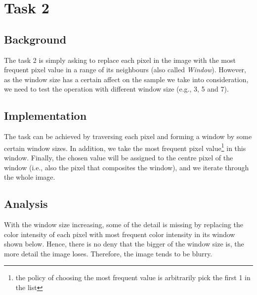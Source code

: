 \documentclass{article}
\begin{document}
\section{Task 2}
\subsection{Background}
The task 2 is simply asking to replace each pixel in the image with the most
frequent pixel value in a range of its neighbours (also called \textit{Window}). However, as the window size has a certain affect on the sample we take into consideration, we need to test the operation with different window size (e.g., 3, 5 and 7). 

\subsection{Implementation}
The task can be achieved by traversing
each pixel and forming a window by some certain window sizes. In addition, we take the most frequent pixel value\footnote{the policy of choosing the most frequent value is arbitrarily pick the first 1 in the list} in this window. Finally, the chosen value will be assigned to the centre pixel of the window (i.e., also the pixel that composites the window), and we iterate through the whole image.

\subsection{Analysis}
With the window size increasing, some of the detail is missing by replacing the color intensity of each pixel with most frequent color intensity in its window shown below. Hence, there is no deny that the bigger of the window size is, the more detail the image loses. Therefore, the image tends to be blurry.
\end{document}
